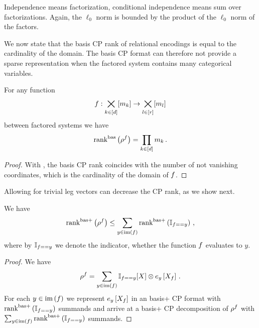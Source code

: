 \begin{example}
	Independence means factorization, conditional independence means sum over factorizations.
	Again, the $\ell_0$ norm is bounded by the product of the $\ell_0$ norm of the factors.
\end{example}






We now state that the basis CP rank of relational encodings is equal to the cardinality of the domain.
The basis CP format can therefore not provide a sparse representation when the factored system contains many categorical variables.

\begin{theorem}\label{the:rencodingBasCP}
	For any function
		\[ f : \bigtimes_{k\in[d]}[m_{k}] \rightarrow  \bigtimes_{l\in[r]}[m_{l}] \]
	between factored systems we have
		\[ \mathrm{rank}^{\mathrm{bas}}\left(\rho^{f}\right) =  \prod_{k\in[d]}m_{k} \, . \]
\end{theorem}
\begin{proof}
	With , the basis CP rank coincides with the number of not vanishing coordinates, which is the cardinality of the domain of $f$.
\end{proof}

Allowing for trivial leg vectors can decrease the CP rank, as we show next.

\begin{theorem}
	We have
		\[ \mathrm{rank}^{\mathrm{bas+}}\left(\rho^{f}\right) \leq  \sum_{y \in \mathrm{im}\left(f\right)} \mathrm{rank}^{\mathrm{bas+}}\left(\mathbb{I}_{f == y} \right) \, , \]
	where by $\mathbb{I}_{f == y} $ we denote the indicator, whether the function $f$ evaluates to $y$.
\end{theorem}
\begin{proof}
	We have
		\[ \rho^{f} = \sum_{y \in \mathrm{im}\left(f\right)} \mathbb{I}_{f == y}[X]  \otimes e_{y}\left[X_{f}\right] \, . \]
	For each $y \in \mathrm{im}\left(f\right)$ we represent $e_{y}\left[X_{f}\right]$ in an basis+ CP format with $\mathrm{rank}^{\mathrm{bas+}}\left(\mathbb{I}_{f == y} \right) $ summands and arrive at a basis+ CP decomposition of $\rho^{f}$ with $\sum_{y \in \mathrm{im}\left(f\right)} \mathrm{rank}^{\mathrm{bas+}}\left(\mathbb{I}_{f == y} \right) $ summands.
\end{proof}

